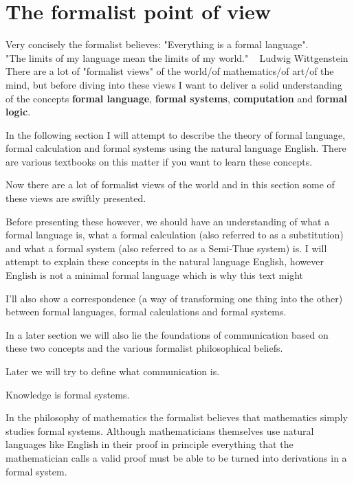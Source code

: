 
\section{The formalist point of view}
Very concisely the formalist believes: "Everything is a formal language". \\
"The limits of my language mean the limits of my world." ~ Ludwig Wittgenstein \\
There are a lot of "formalist views" of the world/of mathematics/of art/of the mind, but before diving into these views I want to deliver a solid understanding of the concepts \textbf{formal language}, \textbf{formal systems}, \textbf{computation} and \textbf{formal logic}.


\iffalse
In the following section I will attempt to describe the theory of formal language, formal calculation and formal systems using the natural language English. There are various textbooks on this matter if you want to learn these concepts.

 

Now there are a lot of formalist views of the world and in this section some of these views are swiftly presented. 

Before presenting these however, we should have an understanding of what a formal language is, what a formal calculation (also referred to as a substitution) and what a formal system (also referred to as a Semi-Thue system) is. I will attempt to explain these concepts in the natural language English, however English is not a minimal formal language which is why this text might 

I'll also show a correspondence (a way of transforming one thing into the other) between formal languages, formal calculations and formal systems.

In a later section we will also lie the foundations of communication based on these two concepts and the various formalist philosophical beliefs.
  


Later we will try to define what communication is.


Knowledge is formal systems.



In the philosophy of mathematics the formalist believes that mathematics simply studies formal systems. Although mathematicians themselves use natural languages like English in their proof in principle everything that the mathematician calls a valid proof must be able to be turned into derivations in a formal system.


